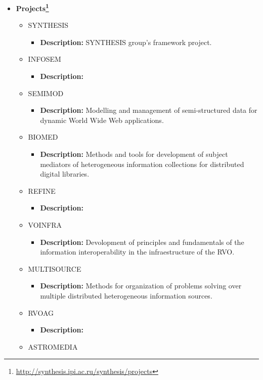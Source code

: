 \begin{itemize}
\item
\textbf{Projects\footnote{\url{http://synthesis.ipi.ac.ru/synthesis/projects}}}
\begin{itemize}
\item SYNTHESIS
\begin{itemize}
\item \textbf{Description:} SYNTHESIS group's framework project.
\end{itemize}
\item INFOSEM
\begin{itemize}
\item \textbf{Description:}
\end{itemize}
\item SEMIMOD
\begin{itemize}
\item \textbf{Description:} Modelling and management of semi-structured data for
dynamic World Wide Web applications.
\end{itemize}
\item BIOMED
\begin{itemize}
\item \textbf{Description:} Methods and tools for development of subject
mediators of he\-te\-ro\-ge\-neous information collections for distributed
digital libraries.
\end{itemize}
\item REFINE
\begin{itemize}
\item \textbf{Description:}
\end{itemize}
\item VOINFRA
\begin{itemize}
\item \textbf{Description:} Devolopment of principles and fundamentals of the
information interoperability in the infraestructure of the RVO.
\end{itemize}
\item MULTISOURCE
\begin{itemize}
\item \textbf{Description:} Methods for organization of problems solving over
multiple distributed he\-te\-ro\-ge\-neous information sources.
\end{itemize}
\item RVOAG
\begin{itemize}
\item \textbf{Description:}
\end{itemize}
\item ASTROMEDIA

\end{itemize}
\end{itemize}
